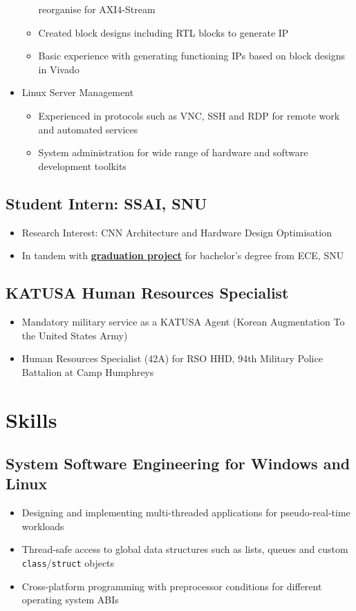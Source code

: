 \documentclass[10pt]{article}
\begin{document}
\begin{itemize}
\begin{itemize}
        reorganise for AXI4-Stream
      \item Created block designs including RTL blocks to generate IP
      \item Basic experience with generating functioning IPs based on block
        designs in Vivado
    \end{itemize}
  \item Linux Server Management
    \begin{itemize}
      \item Experienced in protocols such as VNC, SSH and RDP for remote work
        and automated services
      \item System administration for wide range of hardware and software
        development toolkits
    \end{itemize}
\end{itemize}

\subsection*{Student Intern: SSAI, SNU}
\begin{itemize}
  \item Research Interest: CNN Architecture and Hardware Design Optimisation
  \item In tandem with \textbf{\hyperref[edu:gradproj]{graduation project}} for
    bachelor's degree from ECE, SNU
\end{itemize}

\subsection*{KATUSA Human Resources Specialist}
\begin{itemize}
  \item Mandatory military service as a KATUSA Agent
    (Korean Augmentation To the United States Army)
  \item Human Resources Specialist (42A) for RSO HHD,
    94th Military Police Battalion at Camp Humphreys
\end{itemize}

\section*{Skills}

\subsection*{System Software Engineering for Windows and Linux}
\begin{itemize}
  \item Designing and implementing multi-threaded applications for
    pseudo-real-time workloads
  \item Thread-safe access to global data structures such as lists, queues and
    custom \texttt{class}/\texttt{struct} objects
  \item Cross-platform programming with preprocessor conditions for different
    operating system ABIs
\end{itemize}
\end{document}
